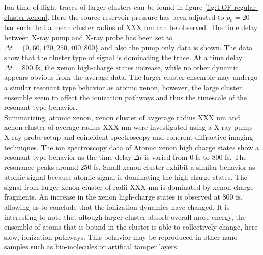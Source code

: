 Ion time of flight traces of larger clusters can be found in figure \ref{fig:TOF-regular-cluster-xenon}. Here the source reservoir pressure has been adjusted to $p_{0}=20$ bar such that a mean cluster radius of XXX nm can be observed. The time delay between X-ray pump and X-ray probe has been set to $\Delta t=\{0,60,120,250,400,800\}$ and also the pump only data is shown. The data show that the cluster type of signal is dominating the trace. At a time delay $\Delta t=800$ fs, the xenon high-charge states increase, while no other dynamic appears obvious from the average data. The larger cluster ensemble may undergo a similar resonant type behavior as atomic xenon, however, the large cluster ensemble seem to affect the ionization pathways and thus the timescale of the resonant type behavior.\\
Summarizing, atomic xenon, xenon cluster of avgerage radius XXX nm and xenon cluster of average radius XXX nm were investigated using a X-ray pump -- X-ray probe setup and coincident spectroscopy and coherent diffractive imaging techniques. The ion spectroscopy data of Atomic xenon high charge states show a resonant type behavior as the time delay $\Delta t$ is varied from 0 fs to 800 fs. The resonance peaks around 250 fs. Small xenon cluster exhibit a similar behavior as atomic signal because atomic signal is dominating the high-charge states. The signal from larger xenon cluster of radii XXX nm is dominated by xenon charge fragments. An increase in the xenon high-charge states is observed at 800 fs, allowing us to conclude that the ionization dynamics have changed. It is interesting to note that altough larger cluster absorb overall more energy, the ensemble of atoms that is bound in the cluster is able to collectively change, here slow, ionization pathways. This behavior may be reproduced in other nano-samples such as bio-molecules or artifical tamper layers.
%
%
%
